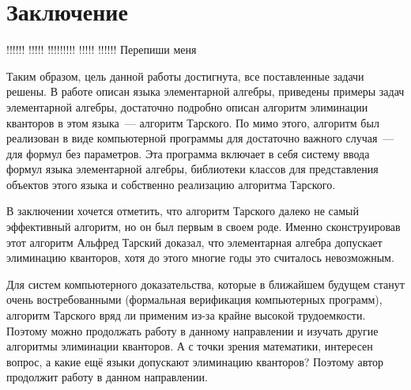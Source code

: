 \section*{Заключение}

	!!!!!!
	!!!!!
	!!!!!!!!!
	!!!!!
	!!!!!!
	Перепиши меня


	Таким образом, цель данной работы достигнута, все поставленные задачи решены. В работе описан языка элементарной алгебры, приведены примеры задач элементарной алгебры, достаточно подробно описан алгоритм элиминации кванторов в этом языка~--- алгоритм Тарского. По мимо этого, алгоритм был реализован в виде компьютерной программы для достаточно важного случая~--- для формул без параметров. Эта программа включает в себя систему ввода формул языка элементарной алгебры, библиотеки классов для представления объектов этого языка и собственно реализацию алгоритма Тарского.

	В заключении хочется отметить, что алгоритм Тарского далеко не самый эффективный алгоритм, но он был первым в своем роде. Именно сконструировав этот алгоритм Альфред Тарский доказал, что элементарная алгебра допускает элиминацию кванторов, хотя до этого многие годы это считалось невозможным. 
	
	Для систем компьютерного доказательства, которые в ближайшем будущем станут очень востребованными (формальная верификация компьютерных программ), алгоритм Тарского вряд ли применим из-за крайне высокой трудоемкости. Поэтому можно продолжать работу в данному направлении и изучать другие алгоритмы элиминации кванторов. А с точки зрения математики, интересен вопрос, а какие ещё языки допускают элиминацию кванторов? Поэтому автор продолжит работу в данном направлении.